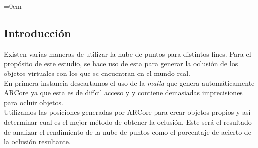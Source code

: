 \parindent=0em
\subsection{Introducción}
\noindent

Existen varias maneras de utilizar la nube de puntos para distintos fines. Para el propósito de este estudio, se hace uso de esta para generar la oclusión de los objetos virtuales con los que se encuentran en el mundo real. \\

En primera instancia descartamos el uso de la \textit{malla} que genera automáticamente ARCore ya que esta es de difícil acceso y y contiene demasiadas imprecisiones para ocluir objetos. \\

Utilizamos las posiciones generadas por ARCore para crear objetos propios y así determinar cual es el mejor método de obtener la oclusión. Este será el resultado de analizar el rendimiento de la nube de puntos como el porcentaje de acierto de la oclusión resultante.\\